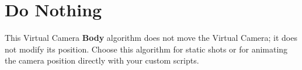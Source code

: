 \chapter{Do Nothing}
\hypertarget{md__hey_tea_9_2_library_2_package_cache_2com_8unity_8cinemachine_0d2_89_87_2_documentation_0i_2_cinemachine_body_do_nothing}{}\label{md__hey_tea_9_2_library_2_package_cache_2com_8unity_8cinemachine_0d2_89_87_2_documentation_0i_2_cinemachine_body_do_nothing}
\label{md__hey_tea_9_2_library_2_package_cache_2com_8unity_8cinemachine_0d2_89_87_2_documentation_0i_2_cinemachine_body_do_nothing_autotoc_md650}%
%
 This Virtual Camera {\bfseries{Body}} algorithm does not move the Virtual Camera; it does not modify its position. Choose this algorithm for static shots or for animating the camera position directly with your custom scripts. 